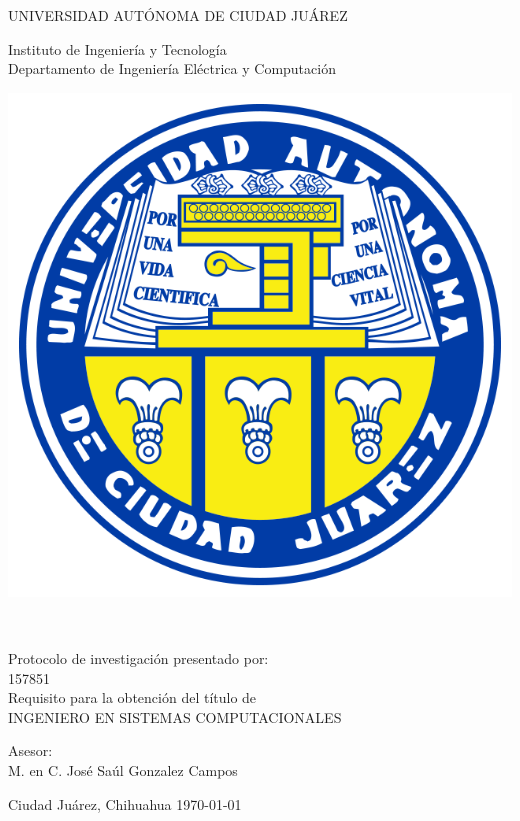 \thispagestyle{empty}
\begin{center} \vfill
{\Large UNIVERSIDAD AUTÓNOMA DE CIUDAD JUÁREZ}\\
\vspace{6mm}
{\large Instituto de Ingeniería y Tecnología\\
\vspace{6mm}
Departamento de Ingeniería Eléctrica y Computación
\vspace{20mm}

\includegraphics [scale=0.7]{imagenes/escudo-uacj} 
\vspace{10mm}






\thetitle\\
\vspace{15mm}


Protocolo de investigación presentado por:\\
\vspace{6mm}
\theauthor\hspace{10mm} 157851\\
\vspace{10mm}
Requisito para la obtención del título de\\
\vspace{6mm}
INGENIERO EN SISTEMAS COMPUTACIONALES\\
\vspace{10mm}

Asesor:\\
{M. en C. José Saúl Gonzalez Campos}\\
} \vfill
	Ciudad Juárez, Chihuahua \hspace{70mm}\today

\end{center} 
